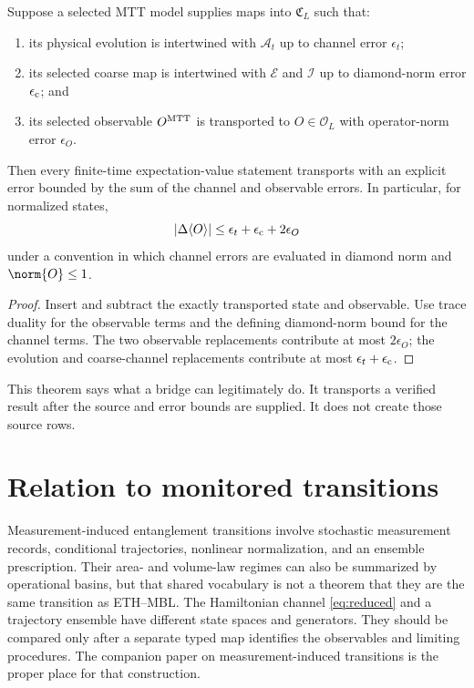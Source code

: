 \documentclass[11pt]{article}
\newcommand{\Obs}{\mathcal O}
\newcommand{\EE}{\mathcal E}
\newcommand{\II}{\mathcal I}
\newcommand{\Dyn}{\mathcal A}
\begin{document}
\begin{theorem}\label{thm:transport}
Suppose a selected MTT model supplies maps into
$\mathfrak C_L$ such that:
\begin{enumerate}
\item its physical evolution is intertwined with $\Dyn_t$ up to channel
error $\epsilon_t$;
\item its selected coarse map is intertwined with $\EE$ and $\II$ up to
diamond-norm error $\epsilon_{\rm c}$; and
\item its selected observable $O^{\rm MTT}$ is transported to
$O\in\Obs_L$ with operator-norm error $\epsilon_O$.
\end{enumerate}
Then every finite-time expectation-value statement transports with an
explicit error bounded by the sum of the channel and observable errors.
In particular, for normalized states,
\[
 |\Delta\langle O\rangle|
 \leq \epsilon_t+\epsilon_{\rm c}+2\epsilon_O
\]
under a convention in which channel errors are evaluated in diamond
norm and $\norm{O}\leq1$.
\end{theorem}

\begin{proof}
Insert and subtract the exactly transported state and observable.  Use
trace duality for the observable terms and the defining diamond-norm
bound for the channel terms.  The two observable replacements contribute
at most $2\epsilon_O$; the evolution and coarse-channel replacements
contribute at most $\epsilon_t+\epsilon_{\rm c}$.
\end{proof}

This theorem says what a bridge can legitimately do.  It transports a
verified result after the source and error bounds are supplied.  It does
not create those source rows.

\section{Relation to monitored transitions}

Measurement-induced entanglement transitions involve stochastic
measurement records, conditional trajectories, nonlinear normalization,
and an ensemble prescription.  Their area- and volume-law regimes can
also be summarized by operational basins, but that shared vocabulary is
not a theorem that they are the same transition as ETH--MBL.  The
Hamiltonian channel \cref{eq:reduced} and a trajectory ensemble have
different state spaces and generators.  They should be compared only
after a separate typed map identifies the observables and limiting
procedures.  The companion paper on measurement-induced transitions is
the proper place for that construction.
\end{document}
